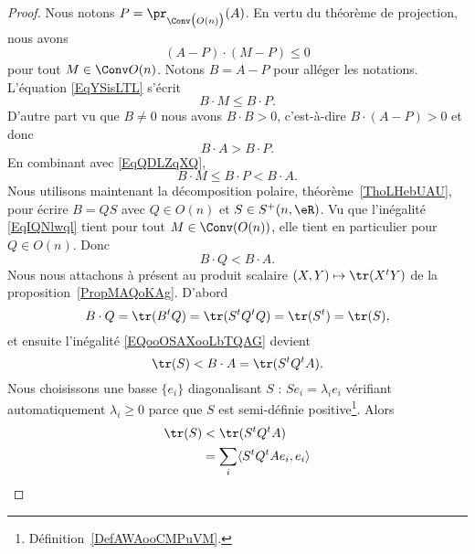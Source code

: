 \begin{proof}
	Nous notons \( P=\pr_{\Conv\big( O(n) \big)}(A)\). En vertu du théorème de projection, nous avons
	\begin{equation}    \label{EqYSisLTL}
		(A-P)\cdot (M-P)\leq 0
	\end{equation}
	pour tout \( M\in\Conv O(n)\). Notons \( B=A-P\) pour alléger les notations. L'équation \eqref{EqYSisLTL} s'écrit
	\begin{equation}    \label{EqQDLZqXQ}
		B\cdot M\leq B\cdot P.
	\end{equation}
	D'autre part vu que \( B \neq 0\) nous avons \( B\cdot B> 0\), c'est-à-dire \( B\cdot (A-P)>0\) et donc
	\begin{equation}
		B\cdot A>B\cdot P.
	\end{equation}
	En combinant avec \eqref{EqQDLZqXQ},
	\begin{equation}        \label{EqIQNlwql}
		B\cdot M\leq B\cdot P<B\cdot A.
	\end{equation}
	Nous utilisons maintenant la décomposition polaire, théorème~\ref{ThoLHebUAU}, pour écrire \( B=QS\) avec \( Q\in O(n)\) et \( S\in S^+(n,\eR)\). Vu que l'inégalité \eqref{EqIQNlwql} tient pour tout \( M\in\Conv(O(n))\), elle tient en particulier pour \( Q\in O(n)\). Donc
	\begin{equation}        \label{EQooOSAXooLbTQAG}
		B\cdot Q<B\cdot A.
	\end{equation}
	Nous nous attachons à présent au produit scalaire \( (X,Y)\mapsto\tr(X^tY)\) de la proposition~\ref{PropMAQoKAg}. D'abord
	\begin{equation}    \label{EaHVxWdau}
		B\cdot Q=\tr(B^tQ)=\tr(S^tQ^tQ)=\tr(S^t)=\tr(S),
	\end{equation}
	et ensuite l'inégalité \eqref{EQooOSAXooLbTQAG} devient
	\begin{equation}
		\tr(S)<B\cdot A=\tr(S^tQ^tA).
	\end{equation}
	Nous choisissons une basse \( \{ e_i \}\) diagonalisant \( S\) : \( Se_i=\lambda_ie_i\) vérifiant automatiquement \( \lambda_i\geq 0\) parce que \( S\) est semi-définie positive\footnote{Définition~\ref{DefAWAooCMPuVM}.}. Alors
	\begin{subequations}
		\begin{align}
			\tr(S) & <\tr(S^tQ^tA)                                                                                          \\
			       & =\sum_i\langle S^tQ^tAe_i, e_i\rangle                                                                  \\

\end{align}
\end{subequations}
\end{proof}
